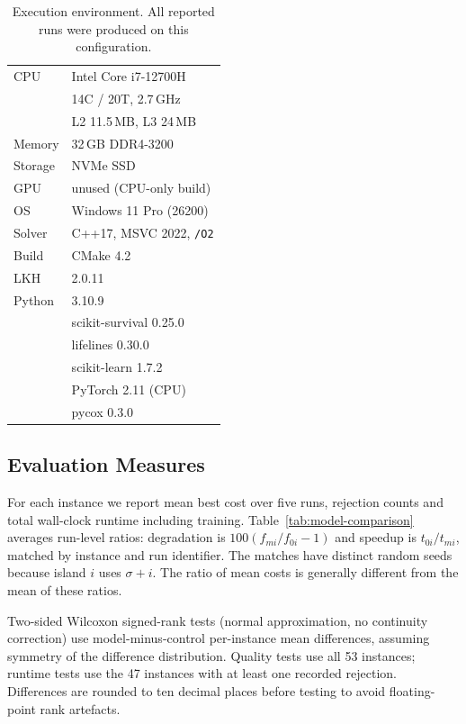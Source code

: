 \documentclass[a4paper,fleqn]{cas-dc}
\begin{document}
\begin{table}[htbp]
\caption{Execution environment. All reported runs were produced on this
configuration.}
\label{tab:environment}
\centering\small
\begin{tabular}{ll}
\toprule
CPU      & Intel Core i7-12700H \\
         & 14C / 20T, 2.7\,GHz \\
         & L2 11.5\,MB, L3 24\,MB \\
Memory   & 32\,GB DDR4-3200 \\
Storage  & NVMe SSD \\
GPU      & unused (CPU-only build) \\
OS       & Windows 11 Pro (26200) \\
\midrule
Solver   & C++17, MSVC 2022, \texttt{/O2} \\
Build    & CMake 4.2 \\
LKH      & 2.0.11 \\
\midrule
Python   & 3.10.9 \\
         & scikit-survival 0.25.0 \\
         & lifelines 0.30.0 \\
         & scikit-learn 1.7.2 \\
         & PyTorch 2.11 (CPU) \\
         & pycox 0.3.0 \\
\bottomrule
\end{tabular}
\end{table}

\subsection{Evaluation Measures}\label{sec:setup-measures}

For each instance we report mean best cost over five runs, rejection counts and
total wall-clock runtime including training. Table~\ref{tab:model-comparison}
averages run-level ratios: degradation is $100(f_{mi}/f_{0i}-1)$ and speedup is
$t_{0i}/t_{mi}$, matched by instance and run identifier. The matches have distinct
random seeds because island $i$ uses $\sigma+i$. The ratio of mean costs is
generally different from the mean of these ratios.

Two-sided Wilcoxon signed-rank tests (normal approximation, no continuity
correction) use model-minus-control per-instance mean
differences, assuming symmetry of the difference distribution. Quality tests
use all 53 instances; runtime tests use the 47 instances with at least one
recorded rejection. Differences are rounded to ten decimal places before testing to avoid floating-point rank artefacts.
\end{document}
